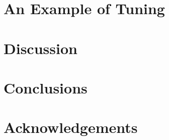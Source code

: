 \documentclass[fleqn,usenatbib]{mnras}
\begin{document}
\section{An Example of Tuning}

\section{Discussion}

\section{Conclusions}

\section*{Acknowledgements}








\bsp	%
\label{lastpage}
\end{document}
